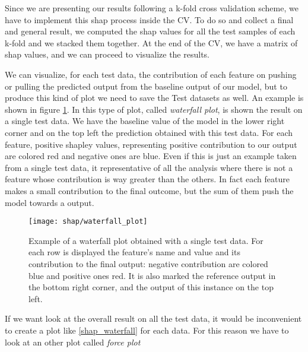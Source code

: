 \documentclass[10pt]{report}
\begin{document}
Since we are presenting our results following a k-fold cross validation scheme, we have to implement this shap process inside the CV.
To do so and collect a final and general result, we computed the shap values for all the test samples of each k-fold and we stacked them together.
At the end of the CV, we have a matrix of shap values, and we can proceed to visualize the results.

\hfill

We can visualize, for each test data, the contribution of each feature on pushing or pulling the predicted output from the baseline output of our model, but to produce this kind of plot we need to save the Test datasets as well.
An example is shown in figure \ref{fig:shap_waterfall}.
In this type of plot, called \emph{waterfall plot}, is shown the result on a single test data. We have the baseline value of the model in the lower right corner and on the top left the prediction obtained with this test data. For each feature, positive shapley values, representing positive contribution to our output are colored red and negative ones are blue.
Even if this is just an example taken from a single test data, it representative of all the analysis where there is not a feature whose contribution is way greater than the others. In fact each feature makes a small contribution to the final outcome, but the sum of them push the model towards a output.

\begin{figure}[h]
\centering
\texttt{[image: shap/waterfall\_plot]}
\caption{Example of a waterfall plot obtained with a single test data. For each row is displayed the feature's name and value and its contribution to the final output: negative contribution are colored blue and positive ones red. It is also marked the reference output in the bottom right corner, and the output of this instance on the top left.
}\label{fig:shap_waterfall}
\end{figure}


If we want look at the overall result on all the test data, it would be inconvenient to create a plot like \ref{shap_waterfall} for each data. For this reason we have to look at an other plot called \emph{force plot}
\end{document}
